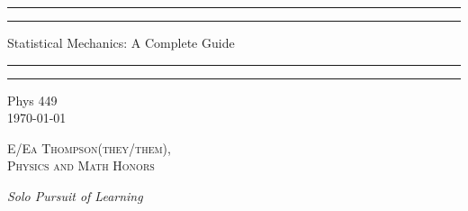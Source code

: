 \documentclass[12pt, a4paper, oneside, openright, titlepage]{book}
\begin{document}

\begin{titlepage}
    \centering
    \scshape
    \vspace*{\baselineskip}
    \rule{\textwidth}{1.6pt}\vspace*{-\baselineskip}\vspace*{2pt}
    \rule{\textwidth}{0.4pt}
    
    \vspace{0.75\baselineskip}
    
    {\LARGE Statistical Mechanics: A Complete Guide}
    
    \vspace{0.75\baselineskip}
    
    \rule{\textwidth}{0.4pt}\vspace*{-\baselineskip}\vspace{3.2pt}
    \rule{\textwidth}{1.6pt}
    
    \vspace{2\baselineskip}
    Phys 449 \\
    \vspace*{3\baselineskip}
    \monthdayyeardate\today \\
    \vspace*{5.0\baselineskip}
    
    {\scshape\Large E/Ea Thompson(they/them), \\ Physics and Math Honors\\}
    
    \vspace{1.0\baselineskip}
    \textit{Solo Pursuit of Learning}
    \vfill
    \enlargethispage{1in}
    \begin{figure}[b!]
    \end{figure}
\end{titlepage}
\end{document}
